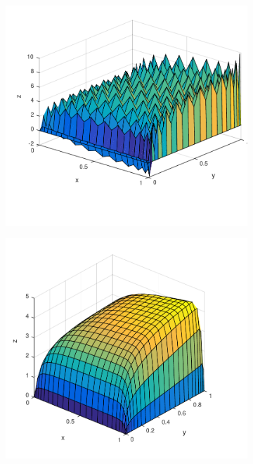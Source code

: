 \begin{figure}[h]
  \centering
  \begin{subfigure}[b]{0.48\textwidth}
	\includegraphics[width=\textwidth]{Figures/Spec_difftrans_aPos.pdf}
  \end{subfigure}%
  \quad
  \begin{subfigure}[b]{0.48\textwidth}
	\includegraphics[width=\textwidth]{Figures/SpecGLS_difftrans_aPos.pdf}

\end{subfigure}
\end{figure}

